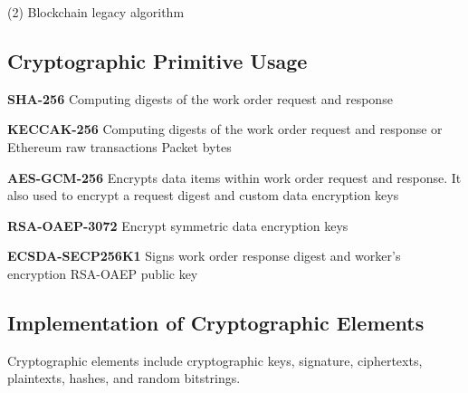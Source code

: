 (2) Blockchain legacy algorithm

\subsection*{Cryptographic Primitive Usage }


\begin{DoxyItemize}
\item {\bfseries S\+H\+A-\/256} Computing digests of the work order request and response
\item {\bfseries K\+E\+C\+C\+A\+K-\/256} Computing digests of the work order request and response or Ethereum raw transactions Packet bytes
\item {\bfseries A\+E\+S-\/\+G\+C\+M-\/256} Encrypts data items within work order request and response. It also used to encrypt a request digest and custom data encryption keys
\item {\bfseries R\+S\+A-\/\+O\+A\+E\+P-\/3072} Encrypt symmetric data encryption keys
\item {\bfseries E\+C\+S\+D\+A-\/\+S\+E\+C\+P256\+K1} Signs work order response digest and worker’s encryption R\+S\+A-\/\+O\+A\+EP public key
\end{DoxyItemize}

\subsection*{Implementation of Cryptographic Elements }

Cryptographic elements include cryptographic keys, signature, ciphertexts, plaintexts, hashes, and random bitstrings.

